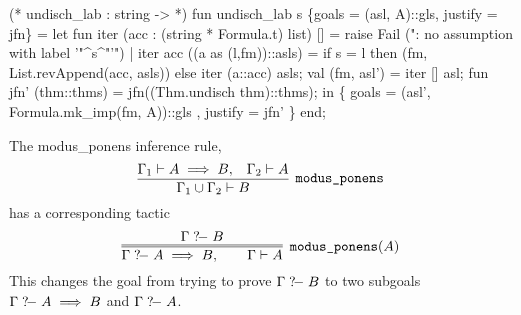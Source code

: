 (* undisch_lab : string ->  *)
fun undisch_lab s \{goals = (asl, A)::gls, justify = jfn\} =
  let
    fun iter (acc : (string * Formula.t) list) [] =
          raise Fail (": no assumption with label '"^s^"'")
      | iter acc ((a as (l,fm))::asls) =
          if s = l
          then (fm, List.revAppend(acc, asls))
          else iter (a::acc) asls;
    val (fm, asl') = iter [] asl;
    fun jfn' (thm::thms) = jfn((Thm.undisch thm)::thms);
  in
    \{ goals = (asl', Formula.mk_imp(fm, A))::gls
    , justify = jfn' \}
  end;
\eatline
{}\nwendcode{}\nwdocspar
\begin{node}
The {\Tt{}modus{\_}ponens\nwendquote} inference rule,
\begin{equation}
\vcenter{\infer[\texttt{modus\_ponens}]{\Gamma_{1}\cup\Gamma_{2}\vdash B}{\Gamma_{1}\vdash A\implies B,&\Gamma_{2}\vdash A}}
\end{equation}
has a corresponding tactic
\begin{equation}
\vcenter{\infer=[\texttt{modus\_ponens}(A)]{\Gamma\gdash A\implies B,\qquad\Gamma\vdash A}{\Gamma\gdash B}}
\end{equation}
This changes the goal from trying to prove $\Gamma\mathrel{?\!-} B$ to two
subgoals $\Gamma\mathrel{?\!-} A\implies B$ and $\Gamma\mathrel{?\!-} A$.
\end{node}

